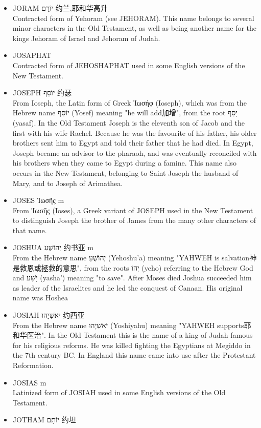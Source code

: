 \begin{itemize}
\item JORAM יוֹרָם 约兰,耶和华高升\\
Contracted form of Yehoram (see JEHORAM). This name belongs to several minor characters in the Old Testament, as well as being another name for the kings Jehoram of Israel and Jehoram of Judah.
\item JOSAPHAT \\
Contracted form of JEHOSHAPHAT used in some English versions of the New Testament.
\item JOSEPH יוֹסֵף 约瑟\\
From Ioseph, the Latin form of Greek Ἰωσήφ (Ioseph), which was from the Hebrew name יוֹסֵף (Yosef) meaning "he will add加增", from the root יָסַף (yasaf). In the Old Testament Joseph is the eleventh son of Jacob and the first with his wife Rachel. Because he was the favourite of his father, his older brothers sent him to Egypt and told their father that he had died. In Egypt, Joseph became an advisor to the pharaoh, and was eventually reconciled with his brothers when they came to Egypt during a famine. This name also occurs in the New Testament, belonging to Saint Joseph the husband of Mary, and to Joseph of Arimathea.
\item JOSES Ἰωσῆς m \\
From Ἰωσῆς (Ioses), a Greek variant of JOSEPH used in the New Testament to distinguish Joseph the brother of James from the many other characters of that name.
\item JOSHUA יְהוֹשֻׁעַ 约书亚 m\\
From the Hebrew name יְהוֹשֻׁעַ (Yehoshu'a) meaning "YAHWEH is salvation神是救恩或拯救的意思", from the roots יְהוֹ (yeho) referring to the Hebrew God and יָשַׁע (yasha') meaning "to save". After Moses died Joshua succeeded him as leader of the Israelites and he led the conquest of Canaan. His original name was Hoshea
\item JOSIAH יֹאשִׁיָהוּ 约西亚 \\
From the Hebrew name יֹאשִׁיָהוּ (Yoshiyahu) meaning "YAHWEH supports耶和华医治". In the Old Testament this is the name of a king of Judah famous for his religious reforms. He was killed fighting the Egyptians at Megiddo in the 7th century BC. In England this name came into use after the Protestant Reformation.
\item JOSIAS m \\
Latinized form of JOSIAH used in some English versions of the Old Testament.
\item JOTHAM יוֹתָם 约坦\\

\end{itemize}
